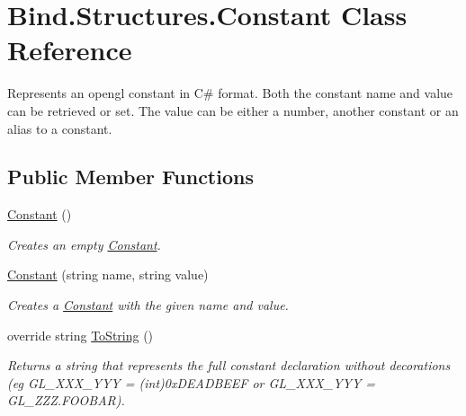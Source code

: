 \hypertarget{class_bind_1_1_structures_1_1_constant}{
\section{Bind.Structures.Constant Class Reference}
\label{class_bind_1_1_structures_1_1_constant}
}


Represents an opengl constant in C\# format. Both the constant name and value can be retrieved or set. The value can be either a number, another constant or an alias to a constant.  


\subsection*{Public Member Functions}
\begin{DoxyCompactItemize}
\item 
\hyperlink{class_bind_1_1_structures_1_1_constant_a342b2c087c5ccd8076ac2d44024ccba5}{Constant} ()
\begin{DoxyCompactList}\small\item\em Creates an empty \hyperlink{class_bind_1_1_structures_1_1_constant}{Constant}. \item\end{DoxyCompactList}\item 
\hyperlink{class_bind_1_1_structures_1_1_constant_a46c9b49299314e23850e640e48354654}{Constant} (string name, string value)
\begin{DoxyCompactList}\small\item\em Creates a \hyperlink{class_bind_1_1_structures_1_1_constant}{Constant} with the given name and value. \item\end{DoxyCompactList}\item 
override string \hyperlink{class_bind_1_1_structures_1_1_constant_ac754f4ab8401ea6fac64a8f1869f2237}{ToString} ()
\begin{DoxyCompactList}\small\item\em Returns a string that represents the full constant declaration without decorations (eg GL\_\-XXX\_\-YYY = (int)0xDEADBEEF or GL\_\-XXX\_\-YYY = GL\_\-ZZZ.FOOBAR). \item\end{DoxyCompactList}\end{DoxyCompactItemize}
